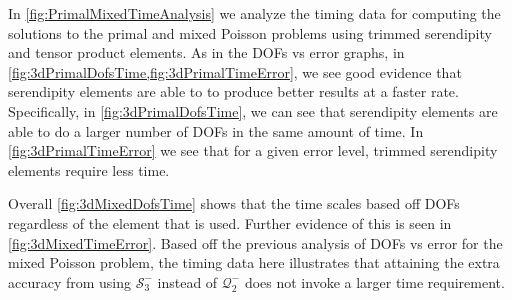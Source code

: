 \documentclass[format=acmsmall,screen,timestamp=false,a4paper]{acmart}
\begin{document}

In \cref{fig:PrimalMixedTimeAnalysis} we analyze the timing data for computing the solutions to the primal and mixed Poisson problems using trimmed serendipity and tensor product elements.  As in the DOFs vs error graphs, in \cref{fig:3dPrimalDofsTime,fig:3dPrimalTimeError}, we see good evidence that serendipity elements are able to to produce better results at a faster rate.  Specifically, in \cref{fig:3dPrimalDofsTime}, we can see that serendipity elements are able to do a larger number of DOFs in the same amount of time.  In \cref{fig:3dPrimalTimeError} we see that for a given error level, trimmed serendipity elements require less time. 

Overall \cref{fig:3dMixedDofsTime} shows that the time scales based off DOFs regardless of the element that is used.  Further evidence of this is seen in \cref{fig:3dMixedTimeError}.  Based off the previous analysis of DOFs vs error for the mixed Poisson problem, the timing data here illustrates that attaining the extra accuracy from using $\mathcal{S}^-_3$ instead of $\mathcal{Q}^-_2$ does not invoke a larger time requirement.  



\end{document}
